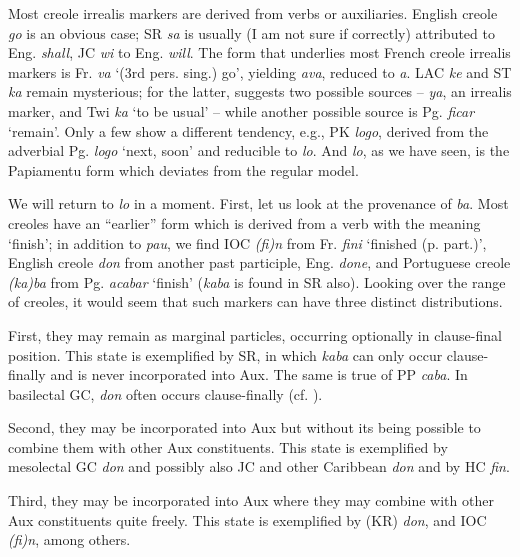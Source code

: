 Most creole irrealis markers are derived from verbs or auxiliaries. English creole \textit{go} is an obvious case; SR \textit{sa} is usually (I am not sure if correctly) attributed to Eng. \textit{shall}, JC \textit{wi} to Eng. \textit{will}. The form that underlies most French creole irrealis markers is Fr. \textit{va} `(3rd pers. sing.) go', yielding \textit{ava}, reduced to \textit{a}. LAC \textit{ke} and ST \textit{ka} remain mysterious; for the latter, \citet{Ferraz1979} suggests two possible sources --  \textit{ya}, an irrealis marker, and Twi \textit{ka} `to be usual' -- while another possible source is Pg. \textit{ficar} `remain'. Only a few  show a different tendency, e.g., PK \textit{logo}, derived from the adverbial Pg. \textit{logo} `next,
soon' and reducible to \textit{lo}. And \textit{lo}, as we have seen, is the Papiamentu form which deviates from the regular model.

We will return to \textit{lo} in a moment. First, let us look at the prove\-nance of \textit{ba}. Most creoles have an ``earlier'' form which is derived from a verb with the meaning `finish'; in addition to \textit{pau}, we find IOC \textit{(fi)n} from Fr. \textit{fini} `finished (p. part.)', English creole \textit{don} from another past participle, Eng. \textit{done}, and Portuguese creole \textit{(ka)ba} from Pg. \textit{acabar} `finish' (\textit{kaba} is found in SR also). Looking over the range of creoles, it would seem that such markers can have three distinct distributions.

First, they may remain as marginal particles, occurring option\-ally in clause-final position. This state is exemplified by SR, in which \textit{kaba} can only occur clause-finally and is never incorporated into Aux. The same is true of PP \textit{caba}. In basilectal GC, \textit{don} often occurs clause-finally (cf. \citealt[Examples 2.65--67]{Bickerton1975}).

Second, they may be incorporated into Aux but without its being possible to combine them with other Aux constituents. This state is exemplified by mesolectal GC \textit{don} and possibly also JC and other Caribbean \textit{don} and by HC \textit{fin}.

Third, they may be incorporated into Aux where they may combine with other Aux constituents quite freely. This state is exem\-plified by  (KR) \textit{don}, and IOC \textit{(fi)n}, among others.

